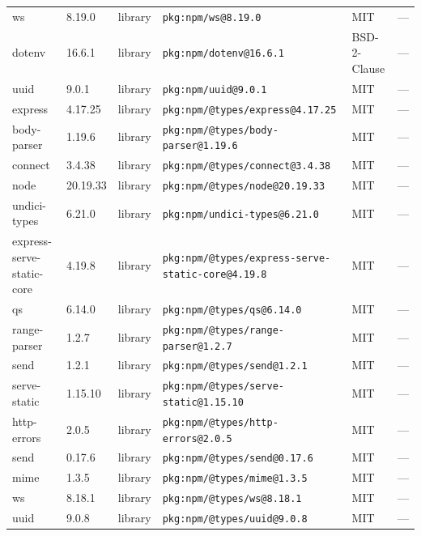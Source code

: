 \documentclass[11pt,a4paper]{article}
\begin{document}
\begin{longtable}{|p{4cm}|p{2cm}|p{1.6cm}|p{5cm}|p{1.5cm}|p{3.5cm}|}
\raggedright ws & 8.19.0 & library & \small\texttt{pkg:npm/ws@8.19.0} & MIT & \small — \\
\raggedright dotenv & 16.6.1 & library & \small\texttt{pkg:npm/dotenv@16.6.1} & BSD-2-Clause & \small — \\
\raggedright uuid & 9.0.1 & library & \small\texttt{pkg:npm/uuid@9.0.1} & MIT & \small — \\
\raggedright express & 4.17.25 & library & \small\texttt{pkg:npm/@types/express@4.17.25} & MIT & \small — \\
\raggedright body-parser & 1.19.6 & library & \small\texttt{pkg:npm/@types/body-parser@1.19.6} & MIT & \small — \\
\raggedright connect & 3.4.38 & library & \small\texttt{pkg:npm/@types/connect@3.4.38} & MIT & \small — \\
\raggedright node & 20.19.33 & library & \small\texttt{pkg:npm/@types/node@20.19.33} & MIT & \small — \\
\raggedright undici-types & 6.21.0 & library & \small\texttt{pkg:npm/undici-types@6.21.0} & MIT & \small — \\
\raggedright express-serve-static-core & 4.19.8 & library & \small\texttt{pkg:npm/@types/express-serve-static-core@4.19.8} & MIT & \small — \\
\raggedright qs & 6.14.0 & library & \small\texttt{pkg:npm/@types/qs@6.14.0} & MIT & \small — \\
\raggedright range-parser & 1.2.7 & library & \small\texttt{pkg:npm/@types/range-parser@1.2.7} & MIT & \small — \\
\raggedright send & 1.2.1 & library & \small\texttt{pkg:npm/@types/send@1.2.1} & MIT & \small — \\
\raggedright serve-static & 1.15.10 & library & \small\texttt{pkg:npm/@types/serve-static@1.15.10} & MIT & \small — \\
\raggedright http-errors & 2.0.5 & library & \small\texttt{pkg:npm/@types/http-errors@2.0.5} & MIT & \small — \\
\raggedright send & 0.17.6 & library & \small\texttt{pkg:npm/@types/send@0.17.6} & MIT & \small — \\
\raggedright mime & 1.3.5 & library & \small\texttt{pkg:npm/@types/mime@1.3.5} & MIT & \small — \\
\raggedright ws & 8.18.1 & library & \small\texttt{pkg:npm/@types/ws@8.18.1} & MIT & \small — \\
\raggedright uuid & 9.0.8 & library & \small\texttt{pkg:npm/@types/uuid@9.0.8} & MIT & \small — \\

\end{longtable}
\end{document}
